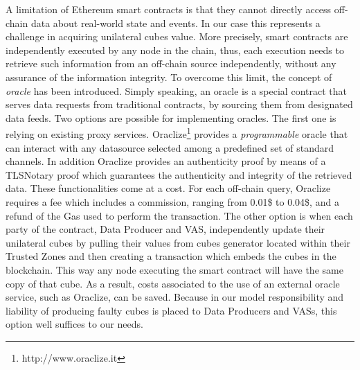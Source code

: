 A limitation of Ethereum smart contracts is that they cannot directly access off-chain data about real-world state and events. In our case this represents a challenge in acquiring unilateral cubes value. More precisely, smart contracts are independently executed by any node in the chain, thus, each execution needs to retrieve such information from an off-chain source independently, without any assurance of the information integrity.
To overcome this limit, the concept of \emph{oracle} has been introduced. Simply speaking, an oracle is a special contract that serves data requests from traditional contracts, by sourcing them from designated data feeds. 
Two options are possible for implementing oracles. The first one is relying on existing proxy services. Oraclize\footnote{http://www.oraclize.it} provides a \emph{programmable} oracle that can interact with any datasource selected among a predefined set of standard channels. In addition Oraclize provides an authenticity proof by means of a TLSNotary proof which guarantees the authenticity and integrity of the retrieved data. These functionalities come at a cost. For each off-chain query, Oraclize requires a fee which includes a commission, ranging from 0.01\$ to 0.04\$, and a refund of the Gas used to perform the transaction. 
The other option is when each party of the contract, Data Producer and VAS, independently update their unilateral cubes by pulling their values from cubes generator located within their Trusted Zones and then creating a transaction which embeds the cubes in the blockchain. This way any node executing the smart contract will have the same copy of that cube. As a result, costs associated to the use of an external oracle service, such as Oraclize, can be saved. Because in our model responsibility and liability of producing faulty cubes is placed to Data Producers and VASs, this option well suffices to our needs.

